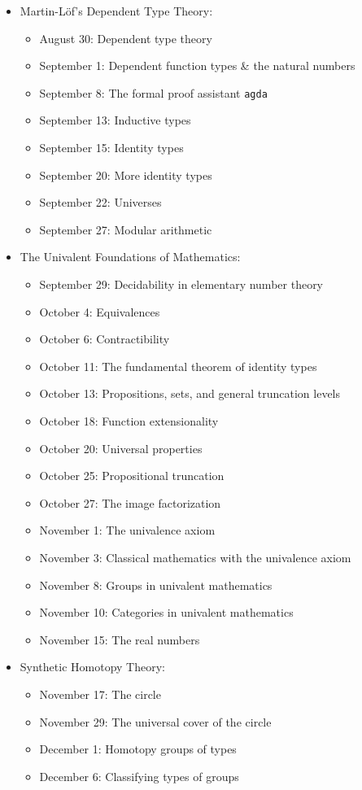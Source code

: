 \documentclass{amsart}
\theoremstyle{definition}
\theoremstyle{remark}
\numberwithin{equation}{section}
\begin{document}
\begin{itemize}
\item {Martin-L\"of's Dependent Type Theory:}
\begin{itemize}
\item {August 30: Dependent type theory}
\item {September 1: Dependent function types \& the natural numbers}
\item {September 8: The formal proof assistant \texttt{agda}}
\item {September 13: Inductive types}
\item {September 15: Identity types}
\item {September 20: More identity types}
\item {September 22: Universes}
\item {September 27: Modular arithmetic}
\end{itemize}
\item {The Univalent Foundations of Mathematics:}
\begin{itemize}
\item {September 29: Decidability in elementary number theory}
\item {October 4: Equivalences}
\item {October 6: Contractibility}
\item {October 11: The fundamental theorem of identity types}
\item {October 13: Propositions, sets, and general truncation levels}
\item {October 18: Function extensionality}
\item {October 20: Universal properties}
\item {October 25: Propositional truncation}
\item {October 27: The image factorization}
\item {November 1: The univalence axiom}
\item {November 3: Classical mathematics with the univalence axiom}
\item {November 8: Groups in univalent mathematics}
\item {November 10: Categories in univalent mathematics}
\item {November 15: The real numbers}
\end{itemize}
\item {Synthetic Homotopy Theory:}
\begin{itemize}
\item {November 17: The circle}
\item {November 29: The universal cover of the circle}
\item {December 1: Homotopy groups of types}
\item {December 6: Classifying types of groups}
\end{itemize}
\end{itemize}

 
\end{document}

